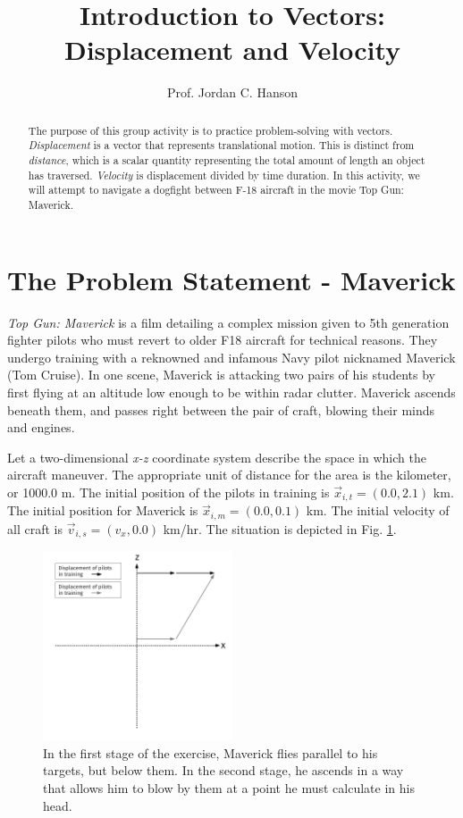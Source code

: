 \documentclass{article}
\begin{document}
\title{Introduction to Vectors: Displacement and Velocity}
\author{Prof. Jordan C. Hanson}

\maketitle

\begin{abstract}
The purpose of this group activity is to practice problem-solving with vectors.  \textit{Displacement} is a vector that represents translational motion.  This is distinct from \textit{distance}, which is a scalar quantity representing the total amount of length an object has traversed.  \textit{Velocity} is displacement divided by time duration.  In this activity, we will attempt to navigate a dogfight between F-18 aircraft in the movie Top Gun: Maverick.
\end{abstract}

\section{The Problem Statement - Maverick}

\textit{Top Gun: Maverick} is a film detailing a complex mission given to 5th generation fighter pilots who must revert to older F18 aircraft for technical reasons.  They undergo training with a reknowned and infamous Navy pilot nicknamed Maverick (Tom Cruise).  In one scene, Maverick is attacking two pairs of his students by first flying at an altitude low enough to be within radar clutter.  Maverick ascends beneath them, and passes right between the pair of craft, blowing their minds and engines.

Let a two-dimensional \textit{x-z} coordinate system describe the space in which the aircraft maneuver.  The appropriate unit of distance for the area is the kilometer, or 1000.0 m.  The initial position of the pilots in training is $\vec{x}_{i,t} = (0.0, 2.1)$ km.  The initial position for Maverick is $\vec{x}_{i,m} = (0.0, 0.1)$ km.  The initial velocity of all craft is $\vec{v}_{i,s} = (v_x,0.0)$ km/hr.  The situation is depicted in Fig. \ref{fig:hunt1}.

\begin{figure}[hb]
\centering
\includegraphics[width=0.5\textwidth,trim=0cm 6cm 0cm 0cm,clip=true]{TheHuntForRedOctober1.pdf}
\caption{\label{fig:hunt1}  In the first stage of the exercise, Maverick flies parallel to his targets, but below them.  In the second stage, he ascends in a way that allows him to blow by them at a point he must calculate in his head.}
\end{figure}
\end{document}
